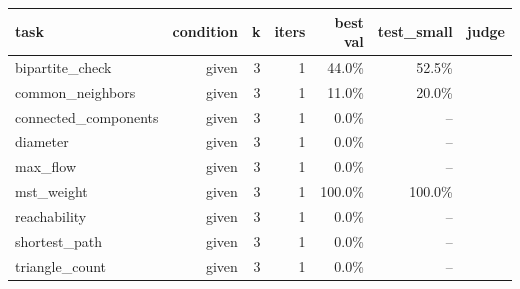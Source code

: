 \begin{tabular}{lrrrrrr}
\toprule
task & condition & k & iters & best val & test\_small & judge \\
\midrule
bipartite\_check & given & 3 & 1 & 44.0\% & 52.5\% &  \\
common\_neighbors & given & 3 & 1 & 11.0\% & 20.0\% &  \\
connected\_components & given & 3 & 1 & 0.0\% & -- &  \\
diameter & given & 3 & 1 & 0.0\% & -- &  \\
max\_flow & given & 3 & 1 & 0.0\% & -- &  \\
mst\_weight & given & 3 & 1 & 100.0\% & 100.0\% &  \\
reachability & given & 3 & 1 & 0.0\% & -- &  \\
shortest\_path & given & 3 & 1 & 0.0\% & -- &  \\
triangle\_count & given & 3 & 1 & 0.0\% & -- &  \\
\bottomrule
\end{tabular}
